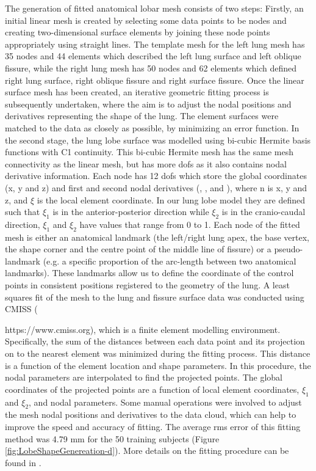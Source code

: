 The generation of fitted anatomical lobar mesh consists of two steps: Firstly, an initial linear mesh is created by selecting some data points to be nodes and creating two-dimensional surface elements by joining these node points appropriately using straight lines. The template mesh for the left lung mesh has 35 nodes and 44 elements which described the left lung surface and left oblique fissure, while the right lung mesh has 50 nodes and 62 elements which defined right lung surface, right oblique fissure and right surface fissure. Once the linear surface mesh has been created, an iterative geometric fitting process is subsequently undertaken, where the aim is to adjust the nodal positions and derivatives representing the shape of the lung. The element surfaces were matched to the data as closely as possible, by minimizing an error function. In the second stage, the lung lobe surface was modelled using bi-cubic Hermite basis functions with C1 continuity. This bi-cubic Hermite mesh has the same mesh connectivity as the linear mesh, but has more \gls{dof}s as it also contains nodal derivative information. Each node has 12 \gls{dof}s which store the global coordinates (x, y and z) and first and second nodal derivatives (, , and ), where n is x, y and z, and $\xi$ is the local element coordinate. In our lung lobe model they are defined such that $\xi_1$ is in the anterior-posterior direction while $\xi_2$ is in the cranio-caudal direction, $\xi_1$ and $\xi_2$ have values that range from 0 to 1. Each node of the fitted mesh is either an anatomical landmark (the left/right lung apex, the base vertex, the shape corner and the centre point of the middle line of fissure) or a pseudo-landmark (e.g. a specific proportion of the arc-length between two anatomical landmarks). These landmarks allow us to define the coordinate of the control points in consistent positions registered to the geometry of the lung. A least squares fit of the mesh to the lung and fissure surface data was conducted using CMISS ({https://www.cmiss.org), which is a finite element modelling environment. Specifically, the sum of the distances between each data point and its projection on to the nearest element was minimized during the fitting process. This distance is a function of the element location and shape parameters. In this procedure, the nodal parameters are interpolated to find the projected points. The global coordinates of the projected points are a function of local element coordinates, $\xi_1$ and $\xi_2$, and nodal parameters. Some manual operations were involved to adjust the mesh nodal positions and derivatives to the data cloud, which can help to improve the speed and accuracy of fitting. The average \gls{rms} error of this fitting method was 4.79 mm for the 50 training subjects (Figure \ref{fig:LobeShapeGenereation-d}). More details on the fitting procedure can be found in  \citep{bradley1997geometric,tawhai2003developing, fernandez2004anatomically}.  


}
